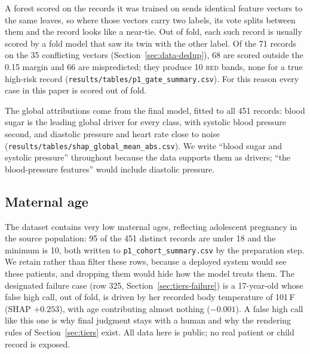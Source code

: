 A forest scored on the records it was trained on sends identical feature
vectors to the same leaves, so where those vectors carry two labels, its vote
splits between them and the record looks like a near-tie. Out of fold, each
such record is usually scored by a fold model that saw its twin with the other
label. Of the 71 records on the 35 conflicting vectors
(Section~\ref{sec:data-dedup}), 68 are scored outside the 0.15 margin and 66
are mispredicted; they produce 10 \textsc{red} bands, none for a true
high-risk record (\texttt{results/tables/p1\_gate\_summary.csv}). For this
reason every case in this paper is scored out of fold.

The global attributions come from the final model, fitted to all 451
records: blood sugar is the leading global driver for
every class, with systolic blood pressure second, and diastolic pressure and
heart rate close to noise
(\texttt{results/tables/shap\_global\_mean\_abs.csv}). We write ``blood sugar
and systolic pressure'' throughout because the data supports them as drivers;
``the blood-pressure features'' would include diastolic pressure.

\subsection{Maternal age}
\label{sec:data-age}

The dataset contains very low maternal ages, reflecting adolescent pregnancy
in the source population: 95 of the 451 distinct records are under 18 and the
minimum is 10, both written to \texttt{p1\_cohort\_summary.csv} by the
preparation step. We retain rather than filter these rows, because a deployed
system would see these patients, and dropping them would hide how the model
treats them. The designated failure
case (row 325, Section~\ref{sec:tiers-failure}) is a 17-year-old whose false
high call, out of fold, is driven by her recorded body temperature of
101\,\textdegree F (SHAP $+0.253$), with age contributing almost nothing
($-0.001$). A false high call like this one is why final judgment
stays with a human and why the rendering rules of Section~\ref{sec:tiers}
exist. All data here is public; no real patient or child record is exposed.
